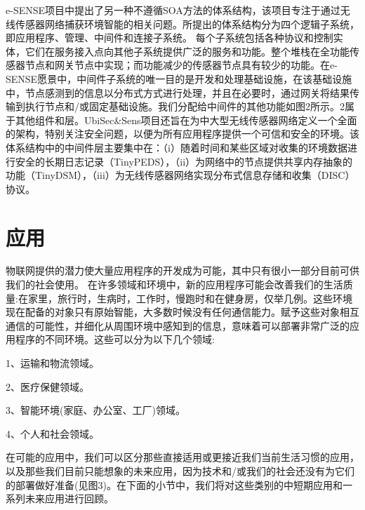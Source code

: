 \documentclass[12pt,a4paper]{article}%
\begin{document}
e-SENSE项目中提出了另一种不遵循SOA方法的体系结构，该项目专注于通过无线传感器网络捕获环境智能的相关问题。所提出的体系结构分为四个逻辑子系统，即应用程序、管理、中间件和连接子系统。
每个子系统包括各种协议和控制实体，它们在服务接入点向其他子系统提供广泛的服务和功能。整个堆栈在全功能传感器节点和网关节点中实现；而功能减少的传感器节点具有较少的功能。在e-SENSE愿景中，中间件子系统的唯一目的是开发和处理基础设施，在该基础设施中，节点感测到的信息以分布式方式进行处理，并且在必要时，通过网关将结果传输到执行节点和/或固定基础设施。我们分配给中间件的其他功能如图2所示。2属于其他组件和层。UbiSec\&Sens项目还旨在为中大型无线传感器网络定义一个全面的架构，特别关注安全问题，以便为所有应用程序提供一个可信和安全的环境。该体系结构中的中间件层主要集中在：（i）随着时间和某些区域对收集的环境数据进行安全的长期日志记录（TinyPEDS），（ii）为网络中的节点提供共享内存抽象的功能（TinyDSM），（iii）为无线传感器网络实现分布式信息存储和收集（DISC）协议。

\section{应用}
物联网提供的潜力使大量应用程序的开发成为可能，其中只有很小一部分目前可供我们的社会使用。
在许多领域和环境中，新的应用程序可能会改善我们的生活质量:在家里，旅行时，生病时，工作时，慢跑时和在健身房，仅举几例。这些环境现在配备的对象只有原始智能，大多数时候没有任何通信能力。赋予这些对象相互通信的可能性，并细化从周围环境中感知到的信息，意味着可以部署非常广泛的应用程序的不同环境。这些可以分为以下几个领域:

1、运输和物流领域。

2、医疗保健领域。

3、智能环境(家庭、办公室、工厂)领域。

4、个人和社会领域。

在可能的应用中，我们可以区分那些直接适用或更接近我们当前生活习惯的应用，以及那些我们目前只能想象的未来应用，因为技术和/或我们的社会还没有为它们的部署做好准备(见图3)。在下面的小节中，我们将对这些类别的中短期应用和一系列未来应用进行回顾。
\end{document}
